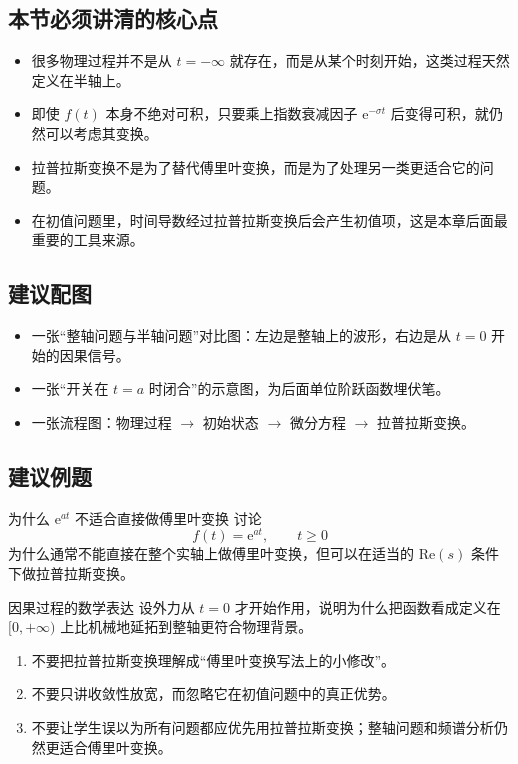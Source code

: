 \subsection*{本节必须讲清的核心点}
\begin{itemize}
    \item 很多物理过程并不是从 $t=-\infty$ 就存在，而是从某个时刻开始，这类过程天然定义在半轴上。
    \item 即使 $f(t)$ 本身不绝对可积，只要乘上指数衰减因子 $\mathrm{e}^{-\sigma t}$ 后变得可积，就仍然可以考虑其变换。
    \item 拉普拉斯变换不是为了替代傅里叶变换，而是为了处理另一类更适合它的问题。
    \item 在初值问题里，时间导数经过拉普拉斯变换后会产生初值项，这是本章后面最重要的工具来源。
\end{itemize}

\subsection*{建议配图}
\begin{itemize}
    \item 一张``整轴问题与半轴问题''对比图：左边是整轴上的波形，右边是从 $t=0$ 开始的因果信号。
    \item 一张``开关在 $t=a$ 时闭合''的示意图，为后面单位阶跃函数埋伏笔。
    \item 一张流程图：物理过程 $\to$ 初始状态 $\to$ 微分方程 $\to$ 拉普拉斯变换。
\end{itemize}

\subsection*{建议例题}
\begin{lizi}{为什么 $\mathrm{e}^{at}$ 不适合直接做傅里叶变换}{}
讨论
\[
    f(t)=\mathrm{e}^{at}, \qquad t\ge 0
\]
为什么通常不能直接在整个实轴上做傅里叶变换，但可以在适当的 $\mathrm{Re}(s)$ 条件下做拉普拉斯变换。
\end{lizi}

\begin{lizi}{因果过程的数学表达}{}
设外力从 $t=0$ 才开始作用，说明为什么把函数看成定义在 $[0,+\infty)$ 上比机械地延拓到整轴更符合物理背景。
\end{lizi}

\begin{jinshi}[本节易错点]
\begin{enumerate}
    \item 不要把拉普拉斯变换理解成``傅里叶变换写法上的小修改''。
    \item 不要只讲收敛性放宽，而忽略它在初值问题中的真正优势。
    \item 不要让学生误以为所有问题都应优先用拉普拉斯变换；整轴问题和频谱分析仍然更适合傅里叶变换。
\end{enumerate}
\end{jinshi}

